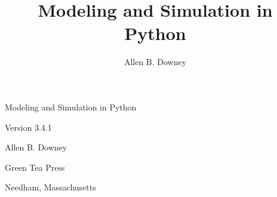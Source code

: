 \documentclass[12pt]{book}
\title{Modeling and Simulation in Python}
\author{Allen B. Downey}
\newcommand{\thetitle}{Modeling and Simulation in Python}
\newcommand{\theauthors}{Allen B. Downey}
\newcommand{\theversion}{3.4.1}
\theoremstyle{exercise}
\newcommand\blankpage{%
    \null
    \thispagestyle{empty}%
    \addtocounter{page}{-1}%
    \newpage}
\newif\ifplastex
\begin{document}
\frontmatter

\ifplastex

\maketitle

\else

\begin{latexonly}

%
%
%
%
%
%




\pagebreak
\thispagestyle{empty}

\begin{flushright}
\vspace*{2.0in}

\begin{spacing}{3}
{\huge \thetitle}
\end{spacing}

\vspace{0.25in}

Version \theversion

\vspace{1in}


{\Large
\theauthors \\
}


\vspace{0.5in}

{\Large Green Tea Press}

{\small Needham, Massachusetts}

\vfill

\end{flushright}




\end{latexonly}
\end{document}
